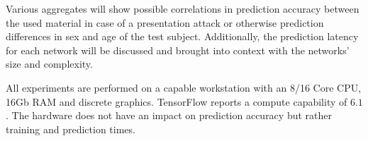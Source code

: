 Various aggregates will show possible correlations in prediction accuracy between the used material in case of a presentation attack or otherwise prediction differences in sex and age of the test subject.
Additionally, the prediction latency for each network will be discussed and brought into context with the networks' size and complexity.

All experiments are performed on a capable workstation with an 8/16 Core CPU, 16Gb RAM and discrete graphics.
TensorFlow reports a compute capability of $6.1$.
The hardware does not have an impact on prediction accuracy but rather training and prediction times.